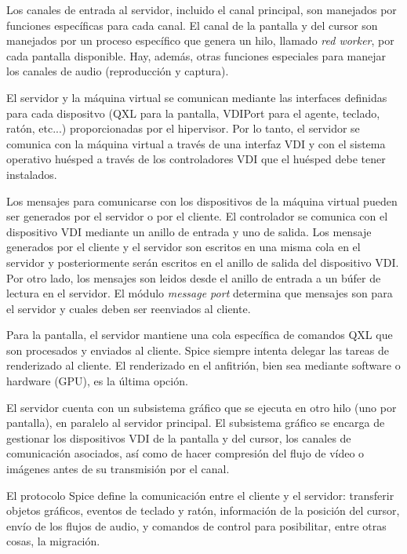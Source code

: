 \documentclass[spanisheDIVcalc,twoside,parskip-,pointlessnumbers,final]{scrbook}
\begin{document}
Los canales de entrada al servidor, incluido el canal principal, son
manejados por funciones específicas para cada canal. El canal de la
pantalla y del cursor son manejados por un proceso específico que
genera un hilo, llamado \emph{red worker}, por cada pantalla disponible.
Hay, además, otras funciones especiales para manejar los canales de
audio (reproducción y captura). 

El servidor y la máquina virtual se comunican mediante las interfaces
definidas para cada dispositvo (QXL para la pantalla, VDIPort para
el agente, teclado, ratón, etc...) proporcionadas por el hipervisor.
Por lo tanto, el servidor se comunica con la máquina virtual a través
de una interfaz VDI y con el sistema operativo huésped a través de
los controladores VDI que el huésped debe tener instalados.

Los mensajes para comunicarse con los dispositivos de la máquina virtual
pueden ser generados por el servidor o por el cliente. El controlador
se comunica con el dispositivo VDI mediante un anillo de entrada y
uno de salida. Los mensaje generados por el cliente y el servidor
son escritos en una misma cola en el servidor y posteriormente serán
escritos en el anillo de salida del dispositivo VDI. Por otro lado,
los mensajes son leidos desde el anillo de entrada a un búfer de lectura
en el servidor. El módulo \emph{message port} determina que mensajes
son para el servidor y cuales deben ser reenviados al cliente.

Para la pantalla, el servidor mantiene una cola específica de comandos
QXL que son procesados y enviados al cliente. Spice siempre intenta
delegar las tareas de renderizado al cliente. El renderizado en el
anfitrión, bien sea mediante software o hardware (GPU), es la última
opción.

El servidor cuenta con un subsistema gráfico que se ejecuta en otro
hilo (uno por pantalla), en paralelo al servidor principal. El subsistema
gráfico se encarga de gestionar los dispositivos VDI de la pantalla
y del cursor, los canales de comunicación asociados, así como de hacer
compresión del flujo de vídeo o imágenes antes de su transmisión por
el canal.

El protocolo Spice define la comunicación entre el cliente y el servidor:
transferir objetos gráficos, eventos de teclado y ratón, información
de la posición del cursor, envío de los flujos de audio, y comandos
de control para posibilitar, entre otras cosas, la migración.
\end{document}
